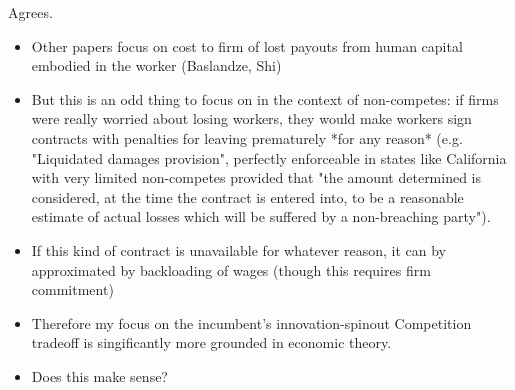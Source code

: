\documentclass[12pt,english]{article}
\theoremstyle{remark}
\begin{document}
Agrees.

\begin{itemize}
	\item Other papers focus on cost to firm of lost payouts from human capital embodied in the worker (Baslandze, Shi)
	\item But this is an odd thing to focus on in the context of non-competes: if firms were really worried about losing workers, they would make workers sign contracts with penalties for leaving prematurely *for any reason* (e.g. "Liquidated damages provision", perfectly enforceable in states like California with very limited non-competes provided that "the amount determined is considered, at the time the contract is entered into, to be a reasonable estimate of actual losses which will be suffered by a non-breaching party"). 
	\item If this kind of contract is unavailable for whatever reason, it can by approximated by backloading of wages (though this requires firm commitment)
	\item Therefore my focus on the incumbent's innovation-spinout Competition tradeoff is singificantly more grounded in economic theory.
	\item Does this make sense?
\end{itemize}
\end{document}
